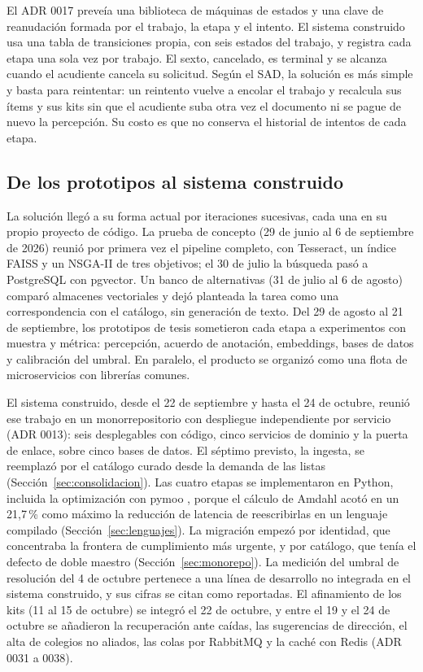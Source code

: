 El ADR 0017 preveía una biblioteca de máquinas de estados y una clave de reanudación
formada por el trabajo, la etapa y el intento. El sistema construido usa una tabla de transiciones
propia, con seis estados del trabajo, y registra cada etapa una sola vez por trabajo. El sexto,
cancelado, es terminal y se alcanza cuando el acudiente cancela su solicitud. Según el SAD,
la solución es más simple y basta para reintentar: un reintento vuelve a encolar el trabajo y
recalcula sus ítems y sus kits sin que el acudiente suba otra vez el documento ni se pague de nuevo
la percepción. Su costo es que no conserva el historial de intentos de cada etapa.

\subsection{De los prototipos al sistema construido}
\label{sec:lenguajes-dev}

La solución llegó a su forma actual por iteraciones sucesivas, cada una en su propio proyecto de
código. La prueba de concepto (29 de junio al 6 de septiembre de 2026) reunió por primera vez el
pipeline completo, con Tesseract, un índice FAISS y un NSGA-II de tres objetivos; el 30 de julio la
búsqueda pasó a PostgreSQL con pgvector. Un banco de alternativas (31 de julio al 6 de agosto)
comparó almacenes vectoriales y dejó planteada la tarea como una correspondencia con el catálogo,
sin generación de texto. Del 29 de agosto al 21 de septiembre, los prototipos de tesis sometieron
cada etapa a experimentos con muestra y métrica: percepción, acuerdo de anotación, embeddings,
bases de datos y calibración del umbral. En paralelo, el producto se organizó como una flota de
microservicios con librerías comunes.

El sistema construido, desde el 22 de septiembre y hasta el 24 de octubre, reunió ese trabajo en un
monorrepositorio con despliegue independiente por servicio (ADR 0013): seis desplegables con
código, cinco servicios de dominio y la puerta de enlace, sobre cinco bases de datos. El séptimo
previsto, la ingesta, se reemplazó por el catálogo curado desde la demanda de las listas
(Sección~\ref{sec:consolidacion}). Las cuatro etapas se implementaron en Python, incluida la
optimización con pymoo \citep{blank_pymoo_2020}, porque el cálculo de Amdahl
\citep{amdahl_validity_1967} acotó en un 21,7\,\% como máximo la reducción de latencia de
reescribirlas en un lenguaje compilado (Sección~\ref{sec:lenguajes}). La migración empezó por
identidad, que concentraba la frontera de cumplimiento más urgente, y por catálogo, que tenía el
defecto de doble maestro (Sección~\ref{sec:monorepo}). La medición del umbral de resolución del 4
de octubre pertenece a una línea de desarrollo no integrada en el sistema construido, y sus cifras
se citan como reportadas. El afinamiento de los kits (11 al 15 de octubre) se integró el 22 de
octubre, y entre el 19 y el 24 de octubre se añadieron la recuperación ante caídas, las
sugerencias de dirección, el alta de colegios no aliados, las colas por RabbitMQ y la caché con
Redis (ADR 0031 a 0038).


